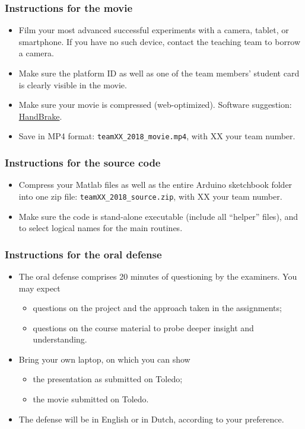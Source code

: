 \documentclass[10pt,a4paper]{article}
\begin{document}
\subsubsection*{Instructions for the movie}
	\begin{itemize}
	\item Film your most advanced successful experiments with a camera, tablet, or smartphone. If you have no such device, contact the teaching team to borrow a camera.
	\item Make sure the platform ID as well as one of the team members' student card is clearly visible in the movie.
	\item Make sure your movie is compressed (web-optimized). Software suggestion: \href{https://handbrake.fr/}{HandBrake}.
	\item Save in MP4 format: \verb"teamXX_2018_movie.mp4", with XX your team number.
	\end{itemize}

\subsubsection*{Instructions for the source code}
	\begin{itemize}
	\item Compress your Matlab files as well as the entire Arduino sketchbook folder into one zip file: \verb"teamXX_2018_source.zip", with XX your team number.
	\item Make sure the code is stand-alone executable (include all ``helper'' files), and to select logical names for the main routines.
	\end{itemize}

\subsubsection*{Instructions for the oral defense}
\begin{itemize}
\item The oral defense comprises 20 minutes of questioning by the examiners. You may expect
		\begin{itemize}
		\item questions on the project and the approach taken in the assignments;
		\item questions on the course material to probe deeper insight and understanding.
		\end{itemize}
\item Bring your own laptop, on which you can show
		\begin{itemize}
		\item the presentation as submitted on Toledo;
		\item the movie submitted on Toledo.
		\end{itemize}
\item The defense will be in English or in Dutch, according to your preference.
\end{itemize}
\end{document}
